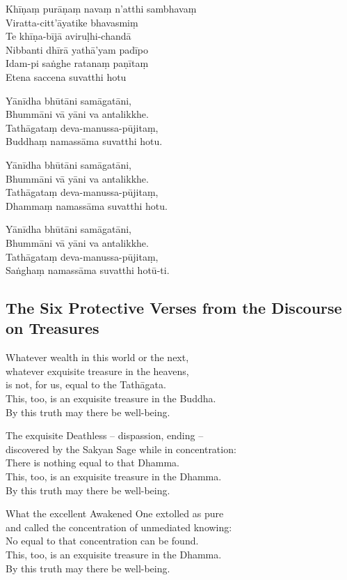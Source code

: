 \begin{paritta}
%
Khīṇaṃ purāṇaṃ navaṃ n'atthi sambhavaṃ\\
Viratta-citt'āyatike bhavasmiṃ\\
Te khīṇa-bījā aviruḷhi-chandā\\
Nibbanti dhīrā yathā'yam padīpo\\
Idam-pi saṅghe ratanaṃ paṇītaṃ\\
Etena saccena suvatthi hotu

Yānīdha bhūtāni samāgatāni,\\
Bhummāni vā yāni va antalikkhe.\\
Tathāgataṃ deva-manussa-pūjitaṃ,\\
Buddhaṃ namassāma suvatthi hotu.

Yānīdha bhūtāni samāgatāni,\\
Bhummāni vā yāni va antalikkhe.\\
Tathāgataṃ deva-manussa-pūjitaṃ,\\
Dhammaṃ namassāma suvatthi hotu.

Yānīdha bhūtāni samāgatāni,\\
Bhummāni vā yāni va antalikkhe.\\
Tathāgataṃ deva-manussa-pūjitaṃ,\\
Saṅghaṃ namassāma suvatthi hotū-ti. 

\end{paritta}

\subsection{The Six Protective Verses from the Discourse on Treasures}

Whatever wealth in this world or the next,\\
whatever exquisite treasure in the heavens,\\
is not, for us, equal to the Tathāgata.\\
This, too, is an exquisite treasure in the Buddha.\\
By this truth may there be well-being.

The exquisite Deathless -- dispassion, ending --\\
discovered by the Sakyan Sage while in concentration:\\
There is nothing equal to that Dhamma.\\
This, too, is an exquisite treasure in the Dhamma.\\
By this truth may there be well-being.

What the excellent Awakened One extolled as pure\\
and called the concentration of unmediated knowing:\\
No equal to that concentration can be found.\\
This, too, is an exquisite treasure in the Dhamma.\\
By this truth may there be well-being.

